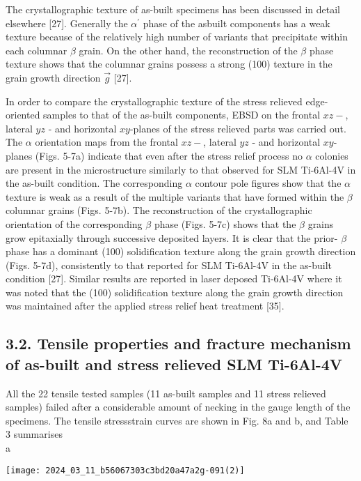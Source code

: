 \documentclass[10pt]{article}
\begin{document}
The crystallographic texture of as-built specimens has been discussed in detail elsewhere [27]. Generally the $\alpha^{\prime}$ phase of the asbuilt components has a weak texture because of the relatively high number of variants that precipitate within each columnar $\beta$ grain. On the other hand, the reconstruction of the $\beta$ phase texture shows that the columnar grains possess a strong (100) texture in the grain growth direction $\vec{g}$ [27].

In order to compare the crystallographic texture of the stress relieved edge-oriented samples to that of the as-built components, EBSD on the frontal $x z-$, lateral $y z$ - and horizontal $x y$-planes of the stress relieved parts was carried out. The $\alpha$ orientation maps from the frontal $x z-$, lateral $y z$ - and horizontal $x y$-planes (Figs. 5-7a) indicate that even after the stress relief process no $\alpha$ colonies are present in the microstructure similarly to that observed for SLM Ti-6Al-4V in the as-built condition. The corresponding $\alpha$ contour pole figures show that the $\alpha$ texture is weak as a result of the multiple variants that have formed within the $\beta$ columnar grains (Figs. 5-7b). The reconstruction of the crystallographic orientation of the corresponding $\beta$ phase (Figs. 5-7c) shows that the $\beta$ grains grow epitaxially through successive deposited layers. It is clear that the prior- $\beta$ phase has a dominant (100) solidification texture along the grain growth direction (Figs. 5-7d), consistently to that reported for SLM Ti-6Al-4V in the as-built condition [27]. Similar results are reported in laser deposed Ti-6Al-4V where it was noted that the (100) solidification texture along the grain growth direction was maintained after the applied stress relief heat treatment [35].

\subsection*{3.2. Tensile properties and fracture mechanism of as-built and stress relieved SLM Ti-6Al-4V}
All the 22 tensile tested samples (11 as-built samples and 11 stress relieved samples) failed after a considerable amount of necking in the gauge length of the specimens. The tensile stressstrain curves are shown in Fig. 8a and b, and Table 3 summarises\\
a

\begin{center}
\texttt{[image: 2024\_03\_11\_b56067303c3bd20a47a2g-091(2)]}
\end{center}
\end{document}
